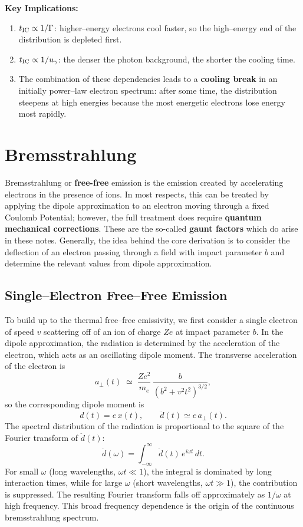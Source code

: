 \begin{remark}
    \textbf{Key Implications:}
    \begin{enumerate}
        \item $t_{\rm IC} \propto 1/\Gamma$: higher--energy electrons
              cool faster, so the high--energy end of the distribution is
              depleted first.
        \item $t_{\rm IC} \propto 1/u_\gamma$: the denser the photon
              background, the shorter the cooling time.
        \item The combination of these dependencies leads to a
              \textbf{cooling break} in an initially power--law electron
              spectrum: after some time, the distribution steepens at
              high energies because the most energetic electrons lose
              energy most rapidly.
    \end{enumerate}
\end{remark}

\section{Bremsstrahlung}

Bremsstrahlung or \textbf{free-free} emission is the emission created by accelerating electrons in the presence of ions. In most respects, this can be treated by applying the dipole approximation to an electron moving through a fixed Coulomb Potential; however, the full treatment does require \textbf{quantum mechanical corrections}. These are the so-called \textbf{gaunt factors} which do arise in these notes. Generally, the idea behind the core derivation is to consider the deflection of an electron passing through a field with impact parameter $b$ and determine the relevant values from dipole approximation.

\subsection{Single--Electron Free--Free Emission}

To build up to the thermal free--free emissivity, we first consider a
single electron of speed $v$ scattering off of an ion of charge $Ze$ at
impact parameter $b$.  In the dipole approximation, the radiation is
determined by the acceleration of the electron, which acts as an
oscillating dipole moment.
The transverse acceleration of the electron is
\[
    a_\perp(t) \;\simeq\; \frac{Ze^2}{m_e}\,
    \frac{b}{(b^2 + v^2 t^2)^{3/2}},
\]
so the corresponding dipole moment is
\[
    d(t) = e\,x(t), \qquad
    \ddot{d}(t) \simeq e\,a_\perp(t).
\]
The spectral distribution of the radiation is proportional to the square
of the Fourier transform of $\ddot{d}(t)$:
\[
    \ddot{d}(\omega) = \int_{-\infty}^{\infty}
    \ddot{d}(t)\,e^{i\omega t}\,dt.
\]
For small $\omega$ (long wavelengths, $\omega t \ll 1$), the integral is
dominated by long interaction times, while for large $\omega$ (short
wavelengths, $\omega t \gg 1$), the contribution is suppressed. The
resulting Fourier transform falls off approximately as $1/\omega$ at
high frequency. This broad frequency dependence is the origin of the
continuous bremsstrahlung spectrum.

